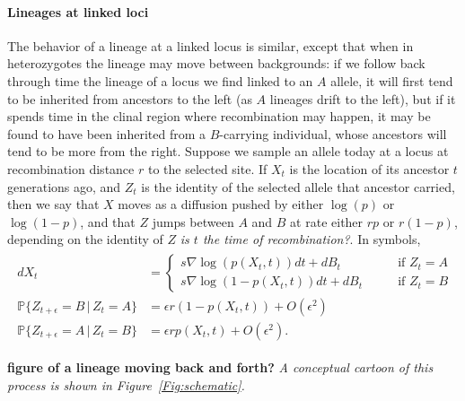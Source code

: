 \documentclass[12pt]{article}
\newcommand{\alisa}[1]{{\em \color{red} #1}}
\renewcommand{\P}{\mathbb{P}}
\newcommand{\grad}{\nabla}
\newcommand{\given}{\,\vert\,}
\begin{document}
\paragraph{Lineages at linked loci}
The behavior of a lineage at a linked locus is similar,
except that when in heterozygotes the lineage may move between backgrounds:
if we follow back through time the lineage of a locus we find linked to an $A$ allele, 
it will first tend to be inherited from ancestors to the left (as $A$ lineages drift to the left),
but if it spends time in the clinal region where recombination may happen,
it may be found to have been inherited from a $B$-carrying individual,
whose ancestors will tend to be more from the right.
Suppose we sample an allele today at a locus at recombination distance $r$ to the selected site.
If $X_t$ is the location of its ancestor $t$ generations ago,
and $Z_t$ is the identity of the selected allele that ancestor carried,
then we say that $X$ moves as a diffusion pushed by either $\log(p)$ or $\log(1-p)$,
and that $Z$ jumps between $A$ and $B$ at rate either $r p$ or $r(1-p)$,
depending on the identity of $Z$ \alisa{is $t$ the time of recombination?}.
In symbols,
\begin{align}
    \begin{aligned} \label{eqn:lineage_motion}
        dX_t &= \begin{cases}
             s \grad \log(p(X_t,t)) dt + dB_t \qquad & \text{if } Z_t = A \\
             s \grad \log(1-p(X_t,t)) dt + dB_t \qquad & \text{if } Z_t = B 
        \end{cases} \\
        \P\{ Z_{t+\epsilon} = B \given Z_t = A \} &= \epsilon r (1-p(X_t,t)) + O(\epsilon^2) \\
        \P\{ Z_{t+\epsilon} = A \given Z_t = B \} &= \epsilon r p(X_t,t) + O(\epsilon^2)  .
    \end{aligned}
\end{align}

\textbf{figure of a lineage moving back and forth?} \alisa{A conceptual cartoon of this process is shown in Figure~\ref{Fig:schematic}.}
\end{document}

